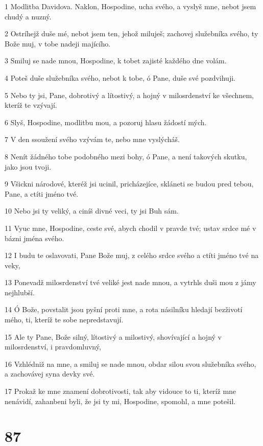 \par 1 Modlitba Davidova. Naklon, Hospodine, ucha svého, a vyslyš mne, nebot jsem chudý a nuzný.
\par 2 Ostríhejž duše mé, nebot jsem ten, jehož miluješ; zachovej služebníka svého, ty Bože muj, v tobe nadeji majícího.
\par 3 Smiluj se nade mnou, Hospodine, k tobet zajisté každého dne volám.
\par 4 Poteš duše služebníka svého, nebot k tobe, ó Pane, duše své pozdvihuji.
\par 5 Nebo ty jsi, Pane, dobrotivý a lítostivý, a hojný v milosrdenství ke všechnem, kteríž te vzývají.
\par 6 Slyš, Hospodine, modlitbu mou, a pozoruj hlasu žádostí mých.
\par 7 V den ssoužení svého vzývám te, nebo mne vyslýcháš.
\par 8 Nenít žádného tobe podobného mezi bohy, ó Pane, a není takových skutku, jako jsou tvoji.
\par 9 Všickni národové, kteréž jsi ucinil, pricházejíce, skláneti se budou pred tebou, Pane, a ctíti jméno tvé.
\par 10 Nebo jsi ty veliký, a ciníš divné veci, ty jsi Buh sám.
\par 11 Vyuc mne, Hospodine, ceste své, abych chodil v pravde tvé; ustav srdce mé v bázni jména svého.
\par 12 I budu te oslavovati, Pane Bože muj, z celého srdce svého a ctíti jméno tvé na veky,
\par 13 Ponevadž milosrdenství tvé veliké jest nade mnou, a vytrhls duši mou z jámy nejhlubší.
\par 14 Ó Bože, povstalit jsou pyšní proti mne, a rota násilníku hledají bezživotí mého, ti, kteríž te sobe nepredstavují.
\par 15 Ale ty Pane, Bože silný, lítostivý a milostivý, shovívající a hojný v milosrdenství, i pravdomluvný,
\par 16 Vzhlédniž na mne, a smiluj se nade mnou, obdar silou svou služebníka svého, a zachovávej syna devky své.
\par 17 Prokaž ke mne znamení dobrotivosti, tak aby vidouce to ti, kteríž mne nenávidí, zahanbeni byli, že jsi ty mi, Hospodine, spomohl, a mne potešil.

\chapter{87}


